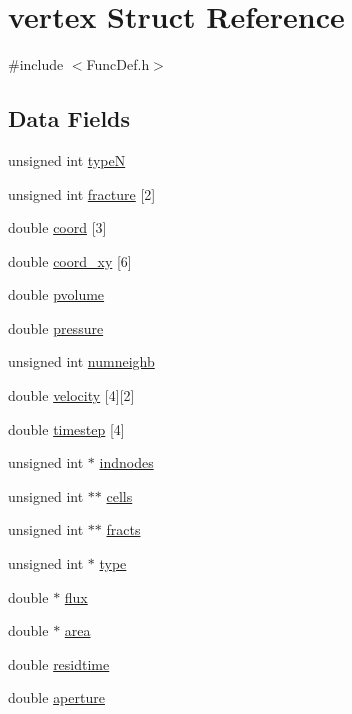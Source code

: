 \hypertarget{structvertex}{}\section{vertex Struct Reference}
\label{structvertex}


{\ttfamily \#include $<$Func\+Def.\+h$>$}

\subsection*{Data Fields}
\begin{DoxyCompactItemize}
\item 
unsigned int \mbox{\hyperlink{structvertex_aa8c5c50393696a507d20dda8ec69fd51}{typeN}}
\item 
unsigned int \mbox{\hyperlink{structvertex_aa2cd06573422bc415cb8f38a67232de7}{fracture}} \mbox{[}2\mbox{]}
\item 
double \mbox{\hyperlink{structvertex_a1eff0deab63f96c97ba5098608d65ad3}{coord}} \mbox{[}3\mbox{]}
\item 
double \mbox{\hyperlink{structvertex_a3473aebf2ce957df8c02095cc98ebb39}{coord\+\_\+xy}} \mbox{[}6\mbox{]}
\item 
double \mbox{\hyperlink{structvertex_a7cf1594124712ff00a9e4d00926f1010}{pvolume}}
\item 
double \mbox{\hyperlink{structvertex_a54ac97be271319fa385aef0685ea0641}{pressure}}
\item 
unsigned int \mbox{\hyperlink{structvertex_acf83b561551952403148f73fe032f57b}{numneighb}}
\item 
double \mbox{\hyperlink{structvertex_a92493253fc12b459eb0599ec07c56743}{velocity}} \mbox{[}4\mbox{]}\mbox{[}2\mbox{]}
\item 
double \mbox{\hyperlink{structvertex_a5e4c0ee67478edf757b52b50859dd25e}{timestep}} \mbox{[}4\mbox{]}
\item 
unsigned int $\ast$ \mbox{\hyperlink{structvertex_a82e41673a29352ee0f004ae7890d5266}{indnodes}}
\item 
unsigned int $\ast$$\ast$ \mbox{\hyperlink{structvertex_a583032cadaa99e8f5c044d3bd10191cf}{cells}}
\item 
unsigned int $\ast$$\ast$ \mbox{\hyperlink{structvertex_adc1951216db706914f5963da2e58accc}{fracts}}
\item 
unsigned int $\ast$ \mbox{\hyperlink{structvertex_aeabf5788639be2723927c854aa11cd33}{type}}
\item 
double $\ast$ \mbox{\hyperlink{structvertex_a9934ed428ad1db71c9aa1e601649791c}{flux}}
\item 
double $\ast$ \mbox{\hyperlink{structvertex_aff6495cfbefb8dffd8714d7c68810ca6}{area}}
\item 
double \mbox{\hyperlink{structvertex_a6ee9434e764f4105136cb10a8c5be642}{residtime}}
\item 
double \mbox{\hyperlink{structvertex_a7588fad77cf759d8db0957c9e957e23a}{aperture}}
\end{DoxyCompactItemize}


